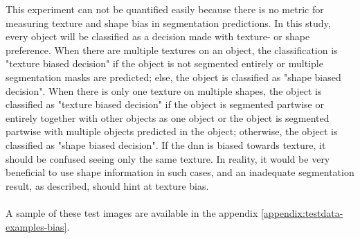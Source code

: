 		This experiment can not be quantified easily because there is no metric for measuring texture and shape bias in segmentation predictions. In this study, every object will be classified as a decision made with texture- or shape preference. When there are multiple textures on an object, the classification is "texture biased decision" if the object is not segmented entirely or multiple segmentation masks are predicted; else, the object is classified as "shape biased decision".
		When there is only one texture on multiple shapes, the object is classified as "texture biased decision" if the object is segmented partwise or entirely together with other objects as one object or the object is segmented partwise with multiple objects predicted in the object; otherwise, the object is classified as "shape biased decision". If the \ac{dnn} is biased towards texture, it should be confused seeing only the same texture. In reality, it would be very beneficial to use shape information in such cases, and an inadequate segmentation result, as described, should hint at texture bias.\\
		\\
		A sample of these test images are available in the appendix \ref{appendix:testdata-examples-bias}.
	
	\clearpage
	
